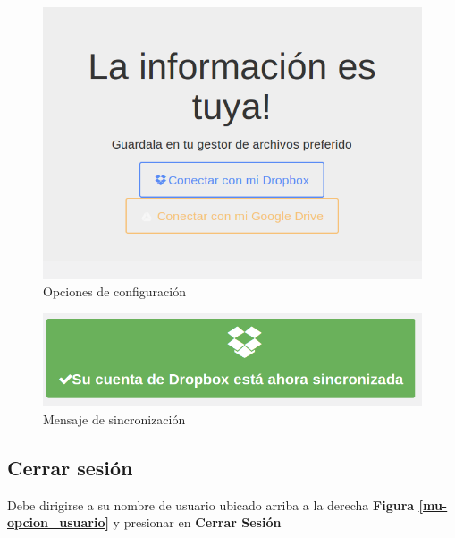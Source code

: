 \begin{figure}
	\centering
	\includegraphics[width=.8\textwidth]{img/manual_de_usuario/configurar_almacenamiento}
	\caption{Opciones de configuración}
	\label{mu-configurar_almacenamiento}
\end{figure}
\begin{figure}
	\centering
	\includegraphics[width=.8\textwidth]{img/manual_de_usuario/cuenta_sincronizada}
	\caption{Mensaje de sincronización}
	\label{mu-cuenta_sincronizada}
\end{figure}
\subsection{Cerrar sesión}
Debe dirigirse a su nombre de usuario ubicado arriba a la derecha \textbf{Figura \ref{mu-opcion_usuario}} y presionar en \textbf{Cerrar Sesión}